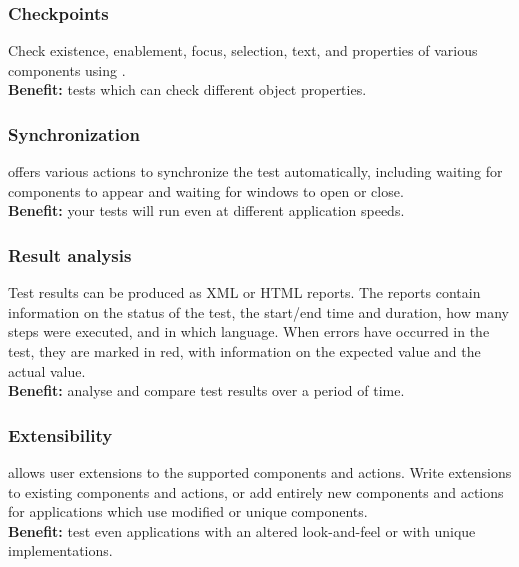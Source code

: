 \subsubsection{Checkpoints}
Check existence, enablement, focus, selection, text, and properties of various components using \gdsteps{}.\\ 
\textbf{Benefit:} tests which can check different object properties. 

\subsubsection{Synchronization}
\gd{} offers various actions to synchronize the test automatically, including waiting for components to appear and waiting for windows to open or close.\\
\textbf{Benefit:} your tests will run even at different application speeds.

\subsubsection{Result analysis}
Test results can be produced as XML or HTML reports. The reports contain information on the status of the test, the start/end time and duration, how many steps were executed, and in which language. When errors have occurred in the test, they are marked in red, with information on the expected value and the actual value. \\
\textbf{Benefit:} analyse and compare test results over a period of time.


\subsubsection{Extensibility}
\gd{} allows user extensions to the supported components and actions. Write extensions to existing components and actions, or add entirely new components and actions for applications which use modified or unique components. \\
\textbf{Benefit:} test even applications with an altered look-and-feel or with unique implementations. 

 



